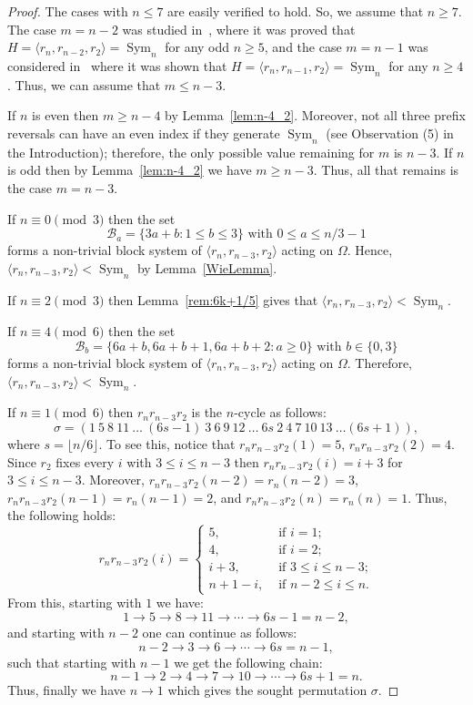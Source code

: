 \documentclass[
final
]{dmtcs-episciences}
\DeclareMathOperator{\Sym}{\mathrm{Sym}}
\begin{document}
\begin{proof} The cases with $n\leqslant 7$ are easily verified to hold. So, we assume that $n\geqslant 7$. The case $m=n-2$ was studied in~\cite{Gun22}, where it was proved that $H=\langle r_n, r_{n-2}, r_2\rangle=\Sym_n$ for any odd $n \geqslant 5$, and the case $m=n-1$ was considered in~\cite{BS03} where it was shown that $H=\langle r_n, r_{n-1}, r_2\rangle=\Sym_n$ for any  $n \geqslant 4$. Thus, we can assume that $m \leqslant n-3$.

If $n$ is even then $m\geqslant n-4$ by Lemma~\ref{lem:n-4_2}. Moreover, not all three prefix reversals can have an even index if they generate $\Sym_n$ (see Observation (5) in the Introduction); therefore, the only possible value remaining for $m$ is $n-3$. If $n$ is odd then by Lemma~\ref{lem:n-4_2} we have $m \geqslant n-3$. Thus, all that remains is the case $m=n-3$.

If $n\equiv0\pmod 3$ then the set 
$$\mathcal{B}_a=\{3a+b:1\leqslant b\leqslant 3\} \mbox{ with } 0\leqslant a\leqslant n/3-1$$ 
forms a non-trivial block system of $\langle r_n, r_{n-3}, r_2\rangle$ acting on $\Omega$. Hence, $\langle r_n, r_{n-3}, r_2\rangle<\Sym_n$ by Lemma~\ref{WieLemma}.

If $n\equiv 2\pmod 3$ then Lemma~\ref{rem:6k+1/5} gives that $\langle r_n, r_{n-3}, r_2\rangle<\Sym_n$.

If $n\equiv 4\pmod 6$ then the set $$\mathcal{B}_b=\{6a+b, 6a+b+1, 6a+b+2 :a\geqslant 0\} \mbox{ with }b \in \{0,3\}$$ forms a non-trivial block system of $\langle r_n, r_{n-3}, r_2\rangle$ acting on $\Omega$. Therefore, $\langle r_n, r_{n-3}, r_2\rangle< \Sym_n$. 

If $n\equiv 1\pmod 6$ then $r_nr_{n-3}r_2$ is the $n$-cycle as follows:
    \[
    \sigma=(1\ 5\ 8\ 11 \ \ldots \ (6s-1)\ 3 \ 6 \ 9\ 12 \ \ldots \ 6s \ 2 \ 4 \ 7 \ 10 \ 13 \ \ldots (6s+1)),  
    \]
    where $s=\lfloor n/6\rfloor$. To see this, notice that $r_nr_{n-3}r_2(1)=5$, $r_nr_{n-3}r_2(2)=4$. Since $r_2$ fixes every $i$ with $3\leqslant i\leqslant n-3$ then $r_nr_{n-3}r_2(i)=i+3$ for $3\leqslant i\leqslant n-3$. Moreover, $r_nr_{n-3}r_2(n-2)=r_n(n-2)=3$, $r_nr_{n-3}r_2(n-1)=r_n(n-1)=2$, and $r_nr_{n-3}r_2(n)=r_n(n)=1$. Thus, the following holds:
    \[
    r_nr_{n-3}r_2(i)=
    \begin{cases}
       5,&\text{ if $i=1$;} \\
       4,&\text{ if $i=2$;} \\
       i+3,&\text{ if $3\leqslant i\leqslant n-3$;}\\
       n+1-i,&\text{ if $n-2\leqslant i\leqslant n$.}
    \end{cases}
    \] From this, starting with $1$ we have:
    \[1\rightarrow5\rightarrow8\rightarrow 11\rightarrow\cdots\rightarrow 6s-1=n-2,\] and starting with $n-2$ one can continue as follows: \[n-2\rightarrow 3\rightarrow6\rightarrow\cdots\rightarrow6s=n-1,\] such that starting with $n-1$ we get the following chain: \[n-1\rightarrow 2\rightarrow 4\rightarrow7\rightarrow10\rightarrow\cdots\rightarrow 6s+1=n.\] Thus, finally we have $n\rightarrow1$ which gives the sought permutation $\sigma$. 


\end{proof}
\end{document}
